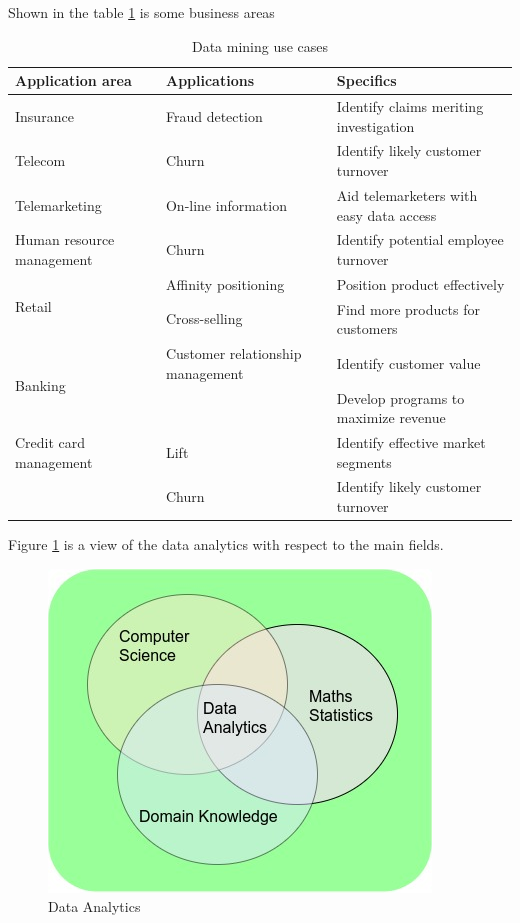 Shown in the table \ref{tableDMusecase} is some business areas 


\begin{table}[H]
	\centering
	\begin{tabular}{|p{4cm}|p{4cm}|l|}
		\hline
		\textbf{Application area} & \textbf{Applications} & \textbf{Specifics}\\
		\hline
		Insurance & Fraud detection & Identify claims meriting investigation\\
		\hline
		Telecom & Churn & Identify likely customer turnover\\
		\hline
		Telemarketing & On-line information & Aid telemarketers with easy data access\\
		\hline
		Human resource management & Churn & Identify potential employee turnover\\
		\hline
		\multirow{2}{4em}{Retail}  & Affinity positioning & Position product effectively\\
		& Cross-selling & Find more products for customers\\
		\hline
		\multirow{2}{4em}{Banking} & Customer relationship management & Identify customer value\\
		&& Develop programs to maximize revenue\\
		\hline
		Credit card management & Lift & Identify effective market segments\\
		& Churn & Identify likely customer turnover\\
		\hline
	\end{tabular}
	\caption{Data mining use cases}
	\label{tableDMusecase}
\end{table}
	
Figure \ref{fig:data-analytics} is a view of the data analytics with respect to the main fields.

\begin{figure}[H]
	\includegraphics[scale = 0.8]{figures/FlowChart.jpg}
	\centering
	\caption{Data Analytics}
	\label{fig:data-analytics}
\end{figure}
\FloatBarrier

